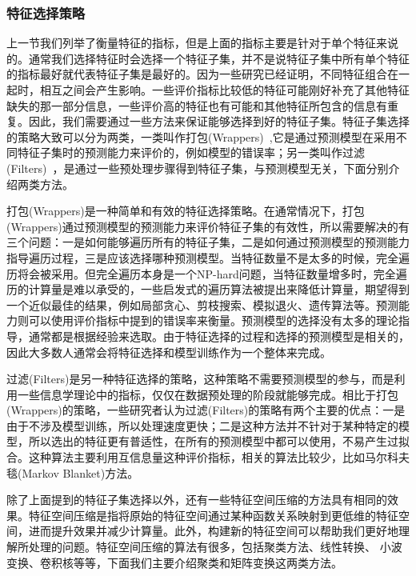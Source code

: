 \subsubsection{特征选择策略}
\label{sssec:feature_select_scheme}
上一节我们列举了衡量特征的指标，但是上面的指标主要是针对于单个特征来说的。通常我们选择特征时会选择一个特征子集，并不是说特征子集中所有单个特征的指标最好就代表特征子集是最好的。因为一些研究已经证明，不同特征组合在一起时，相互之间会产生影响。一些评价指标比较低的特征可能刚好补充了其他特征缺失的那一部分信息，一些评价高的特征也有可能和其他特征所包含的信息有重复。因此，我们需要通过一些方法来保证能够选择到好的特征子集。特征子集选择的策略大致可以分为两类，一类叫作打包(Wrappers)~\cite{Kohavi1997Wrappers},它是通过预测模型在采用不同特征子集时的预测能力来评价的，例如模型的错误率；另一类叫作过滤(Filters)~\cite{Torkkola2003Feature}，是通过一些预处理步骤得到特征子集，与预测模型无关，下面分别介绍两类方法。

打包(Wrappers)是一种简单和有效的特征选择策略。在通常情况下，打包(Wrappers)通过预测模型的预测能力来评价特征子集的有效性，所以需要解决的有三个问题：一是如何能够遍历所有的特征子集，二是如何通过预测模型的预测能力指导遍历过程，三是应该选择哪种预测模型。当特征数量不是太多的时候，完全遍历将会被采用。但完全遍历本身是一个NP-hard问题，当特征数量增多时，完全遍历的计算量是难以承受的，一些启发式的遍历算法被提出来降低计算量，期望得到一个近似最佳的结果，例如局部贪心、剪枝搜索、模拟退火、遗传算法等。预测能力则可以使用评价指标中提到的错误率来衡量。预测模型的选择没有太多的理论指导，通常都是根据经验来选取。由于特征选择的过程和选择的预测模型是相关的，因此大多数人通常会将特征选择和模型训练作为一个整体来完成。

过滤(Filters)是另一种特征选择的策略，这种策略不需要预测模型的参与，而是利用一些信息学理论中的指标，仅仅在数据预处理的阶段就能够完成。相比于打包(Wrappers)的策略，一些研究者认为过滤(Filters)的策略有两个主要的优点：一是由于不涉及模型训练，所以处理速度更快；二是这种方法并不针对于某种特定的模型，所以选出的特征更有普适性，在所有的预测模型中都可以使用，不易产生过拟合。这种算法主要利用互信息量这种评价指标，相关的算法比较少，比如马尔科夫毯(Markov Blanket)方法。

除了上面提到的特征子集选择以外，还有一些特征空间压缩的方法具有相同的效果。特征空间压缩是指将原始的特征空间通过某种函数关系映射到更低维的特征空间，进而提升效果并减少计算量。此外，构建新的特征空间可以帮助我们更好地理解所处理的问题。特征空间压缩的算法有很多，包括聚类方法、线性转换、
小波变换、卷积核等等，下面我们主要介绍聚类和矩阵变换这两类方法。

